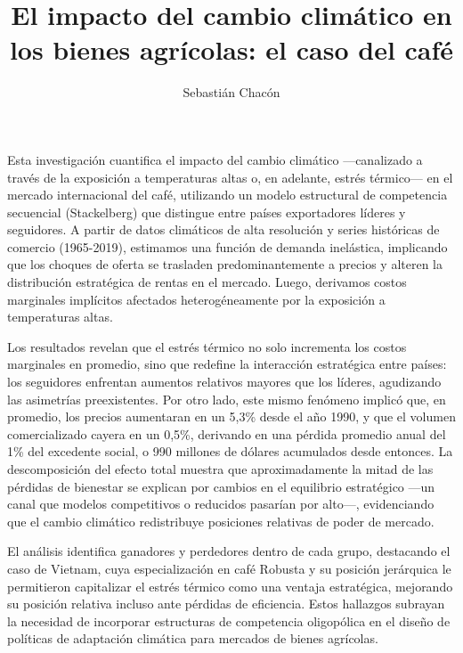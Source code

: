 \documentclass[spanish]{umemoria}
\author{Sebastián Chacón}
\title{El impacto del cambio climático en los bienes agrícolas: el caso del café}
\begin{document}
\frontmatter
\maketitle

\begin{resumen}

Esta investigación cuantifica el impacto del cambio climático —canalizado a través de la exposición a temperaturas altas o, en adelante, estrés térmico— en el mercado internacional del café, utilizando un modelo estructural de competencia secuencial (Stackelberg) que distingue entre países exportadores líderes y seguidores. A partir de datos climáticos de alta resolución y series históricas de comercio (1965-2019), estimamos una función de demanda inelástica, implicando que los choques de oferta se trasladen predominantemente a precios y alteren la distribución estratégica de rentas en el mercado. Luego, derivamos costos marginales implícitos afectados heterogéneamente por la exposición a temperaturas altas.

Los resultados revelan que el estrés térmico no solo incrementa los costos marginales en promedio, sino que redefine la interacción estratégica entre países: los seguidores enfrentan aumentos relativos mayores que los líderes, agudizando las asimetrías preexistentes. Por otro lado, este mismo fenómeno implicó que, en promedio, los precios aumentaran en un 5,3\% desde el año 1990, y que el volumen comercializado cayera en un 0,5\%, derivando en una pérdida promedio anual del 1\% del excedente social, o 990 millones de dólares acumulados desde entonces. La descomposición del efecto total muestra que aproximadamente la mitad de las pérdidas de bienestar se explican por cambios en el equilibrio estratégico —un canal que modelos competitivos o reducidos pasarían por alto—, evidenciando que el cambio climático redistribuye posiciones relativas de poder de mercado.

El análisis identifica ganadores y perdedores dentro de cada grupo, destacando el caso de Vietnam, cuya especialización en café Robusta y su posición jerárquica le permitieron capitalizar el estrés térmico como una ventaja estratégica, mejorando su posición relativa incluso ante pérdidas de eficiencia. Estos hallazgos subrayan la necesidad de incorporar estructuras de competencia oligopólica en el diseño de políticas de adaptación climática para mercados de bienes agrícolas.
\end{resumen}

\end{document}
